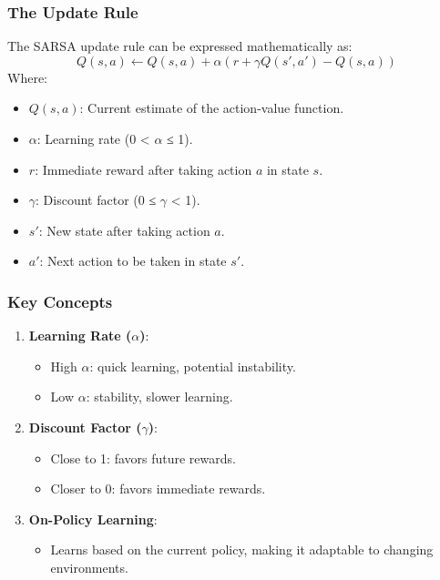 \documentclass[aspectratio=169]{beamer}
\begin{document}
\begin{frame}[fragile]
    \frametitle{The Update Rule}
    The SARSA update rule can be expressed mathematically as:
    \begin{equation}
        Q(s, a) \leftarrow Q(s, a) + \alpha \left( r + \gamma Q(s', a') - Q(s, a) \right)
    \end{equation}
    Where:
    \begin{itemize}
        \item \( Q(s, a) \): Current estimate of the action-value function.
        \item \( \alpha \): Learning rate (0 < \( \alpha \) ≤ 1).
        \item \( r \): Immediate reward after taking action \( a \) in state \( s \).
        \item \( \gamma \): Discount factor (0 ≤ \( \gamma \) < 1).
        \item \( s' \): New state after taking action \( a \).
        \item \( a' \): Next action to be taken in state \( s' \).
    \end{itemize}
\end{frame}

\begin{frame}[fragile]
    \frametitle{Key Concepts}
    \begin{enumerate}
        \item \textbf{Learning Rate (\( \alpha \))}:
            \begin{itemize}
                \item High \( \alpha \): quick learning, potential instability.
                \item Low \( \alpha \): stability, slower learning.
            \end{itemize}
        
        \item \textbf{Discount Factor (\( \gamma \))}:
            \begin{itemize}
                \item Close to 1: favors future rewards.
                \item Closer to 0: favors immediate rewards.
            \end{itemize}

        \item \textbf{On-Policy Learning}:
            \begin{itemize}
                \item Learns based on the current policy, making it adaptable to changing environments.
            \end{itemize}
    \end{enumerate}
\end{frame}
\end{document}
